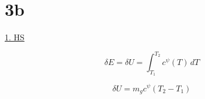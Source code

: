 

\section*{3b}

\underline{1. HS}

\[
\delta E = \delta U = \int_{T_1}^{T_2} c^{\psi}(T) \, dT
\]

\[
\delta U = m_g c^{\psi} (T_2 - T_1)
\]
